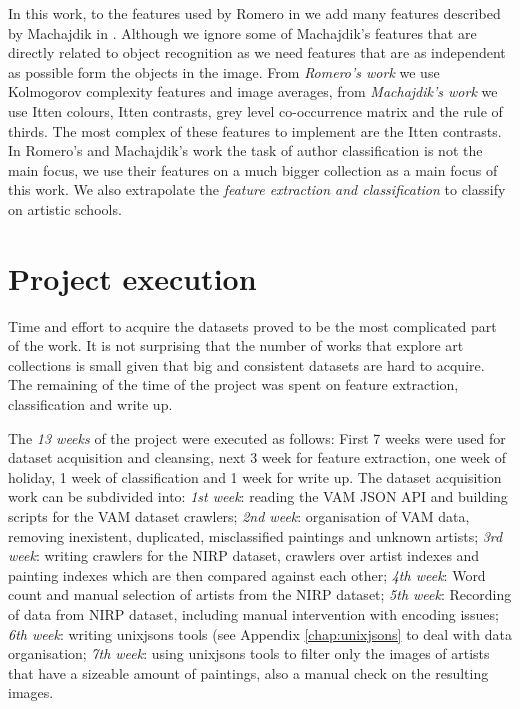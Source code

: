 \documentclass[11pt,a4paper,draft]{report}
\begin{document}
\begin{multicols}{2}
In this work, to the features used by Romero in \cite{rmc12ajs} we add many
features described by Machajdik in \cite{mach10clas}.  Although we ignore some
of Machajdik's features that are directly related to object recognition as we
need features that are as independent as possible form the objects in the
image.  From \emph{Romero's work} we use Kolmogorov complexity features and
image averages, from \emph{Machajdik's work} we use Itten colours, Itten
contrasts, grey level co-occurrence matrix and the rule of thirds.  The most
complex of these features to implement are the Itten contrasts.  In Romero's
and Machajdik's work the task of author classification is not the main focus,
we use their features on a much bigger collection as a main focus of this work.
We also extrapolate the \emph{feature extraction and classification} to
classify on artistic schools.

\section{Project execution}

Time and effort to acquire the datasets proved to be the most complicated part
of the work.  It is not surprising that the number of works that explore art
collections is small given that big and consistent datasets are hard to
acquire.  The remaining of the time of the project was spent on feature
extraction, classification and write up.

The \emph{13 weeks} of the project were executed as follows: First 7 weeks were
used for dataset acquisition and cleansing, next 3 week for feature extraction,
one week of holiday, 1 week of classification and 1 week for write up.  The
dataset acquisition work can be subdivided into: \emph{1st week}: reading the
VAM JSON API and building scripts for the VAM dataset crawlers; \emph{2nd
week}: organisation of VAM data, removing inexistent, duplicated, misclassified
paintings and unknown artists;  \emph{3rd week}: writing crawlers for the NIRP
dataset, crawlers over artist indexes and painting indexes which are then
compared against each other;  \emph{4th week}: Word count and manual selection
of artists from the NIRP dataset;  \emph{5th week}: Recording of data from NIRP
dataset, including manual intervention with encoding issues;  \emph{6th week}:
writing unixjsons tools (see Appendix \ref{chap:unixjsons} to deal with data
organisation;  \emph{7th week}: using unixjsons tools to filter only the images
of artists that have a sizeable amount of paintings, also a manual check on the
resulting images.


\end{multicols}
\end{document}
